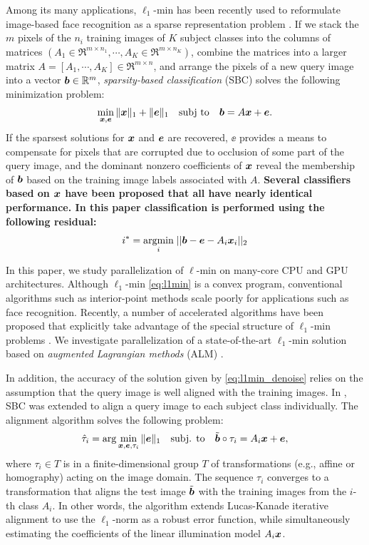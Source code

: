 \documentclass[preprint]{sigplanconf}
\begin{document}
Among its many applications, $\ell_1$-min has been recently used to reformulate
image-based face recognition as a sparse representation problem
\cite{WrightJ2009-PAMI}.  If we stack the $m$ pixels of the $n_i$ training images of $K$ subject
classes into the columns of matrices $(A_1\in\Re^{m\times n_1}, \cdots, A_K\in\Re^{m\times n_K})$, combine
the matrices into a larger matrix $A = [A_1, \cdots, A_K]\in\Re^{m\times n}$, and arrange the pixels of a new
query image into a vector ${\boldsymbol{b}}\in{\mathbb{R}}^m$, \emph{sparsity-based
classification} (SBC) solves the following minimization problem:
\begin{equation}
\min_{{\boldsymbol{x}}, {\boldsymbol{e}}} \| {\boldsymbol{x}} \|_1 + \|{\boldsymbol{e}}\|_1 \quad \textup{subj to} \quad {\boldsymbol{b}} = A {\boldsymbol{x}} + {\boldsymbol{e}}.
\label{eq:l1min_denoise}
\end{equation}
If the sparsest solutions for ${\boldsymbol{x}}$ and $\boldsymbol{e}$ are recovered, $\ee$ provides a
means to compensate for pixels that are corrupted due to occlusion of some part of the query
image, and the dominant nonzero coefficients of ${\boldsymbol{x}}$ reveal the membership of
${\boldsymbol{b}}$ based on the training image labels associated with $A$.  
{\bf Several
classifiers based on ${\boldsymbol{x}}$ have been proposed that all have nearly identical 
performance.  In this paper classification is performed using the following residual:
\begin{equation}
i^* = {\hbox{$\underset{i}{\mbox{argmin}}\;$}} || {\boldsymbol{b}} - {\boldsymbol{e}} - A_i {\boldsymbol{x}}_i||_2
\label{eq:classification}
\end{equation}
}

In this paper, we study parallelization of $\ell$-min on many-core CPU and GPU
architectures. Although $\ell_1$-min \eqref{eq:l1min} is a convex
program, conventional algorithms such as interior-point methods
\cite{ChenS2001-SIAM,TibshiraniR1996} scale poorly
for applications such as face recognition. Recently, a number of
accelerated algorithms have been proposed that explicitly take advantage of
the special structure of $\ell_1$-min problems
\cite{LorisI2009,YangA2010-ICIP}. We investigate parallelization of a
state-of-the-art $\ell_1$-min solution based on
\emph{augmented Lagrangian methods} (ALM) \cite{BertsekasD2003,YangA2010-ICIP}.

In addition, the accuracy of the solution given by \eqref{eq:l1min_denoise} relies on the assumption
that the query image is well aligned with the training images.
In \cite{WagnerA2009-CVPR}, SBC was extended to align
a query image to each subject class individually. The alignment algorithm solves
the following problem:
\begin{equation}
\hat{\tau}_i = \arg\min_{{\boldsymbol{x}}, {\boldsymbol{e}}, \tau_i} \|{\boldsymbol{e}}\|_1\quad \mbox{subj. to}\quad \tilde{{\boldsymbol{b}}}\circ\tau_i = A_i{\boldsymbol{x}} + {\boldsymbol{e}},
\label{eq:l1min_alignment}
\end{equation}
where $\tau_i\in T$ is in a finite-dimensional group $T$ of transformations
(e.g., affine or homography) acting on the image domain.  The sequence
$\tau_i$ converges to a transformation that aligns the test image $\tilde{{\boldsymbol{b}}}$
with the training images from the $i$-th class $A_i$. In other words, the algorithm 
extends Lucas-Kanade iterative alignment \cite{LucasB1981} to use the
$\ell_1$-norm as a robust error function, while simultaneously estimating
the coefficients of the linear illumination model $A_i{\boldsymbol{x}}$.  
\end{document}
